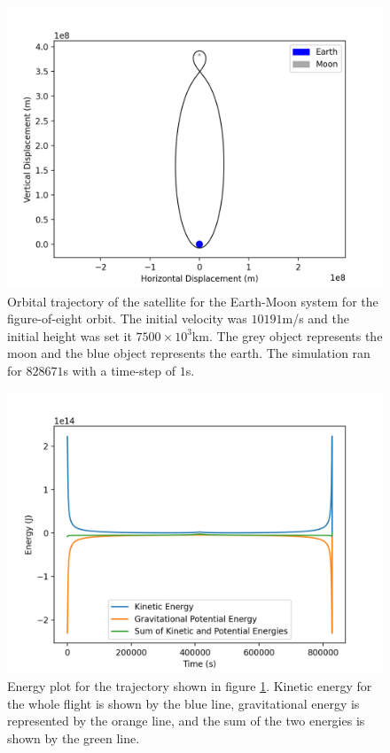 \documentclass{revtex4-2}
\begin{document}
\begin{figure}
    \includegraphics[width = 0.96\linewidth]{Figureo8Orbit.png}
    \caption{Orbital trajectory of the satellite for the Earth-Moon system for the figure-of-eight orbit. The initial velocity was $10191$m/s and the initial height was set it $7500\times10^3$km. The grey object represents
        the moon and the blue object represents the earth. The simulation ran for $828671$s with a time-step of $1$s.}
    \label{Figureof8Orbit}
\end{figure}
\begin{figure}
    \includegraphics[width = 0.96\linewidth]{Figureo8Energy.png}
    \caption{Energy plot for the trajectory shown in figure \ref{Figureof8Orbit}. Kinetic energy for the whole flight is shown by the blue line, gravitational energy
        is represented by the orange line, and the sum of the two energies is shown by the green line. }
    \label{SlingshotEnergy}
\end{figure}
\end{document}
